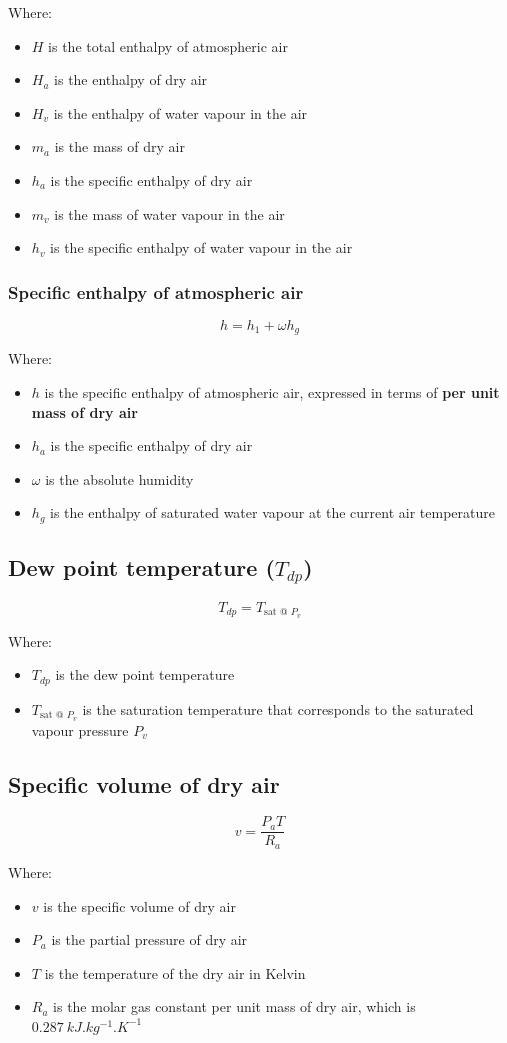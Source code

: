 \documentclass[11pt]{article}
\begin{document}
Where:
\begin{itemize}
\item \(H\) is the total enthalpy of atmospheric air
\item \(H_a\) is the enthalpy of dry air
\item \(H_v\) is the enthalpy of water vapour in the air
\item \(m_a\) is the mass of dry air
\item \(h_a\) is the specific enthalpy of dry air
\item \(m_v\) is the mass of water vapour in the air
\item \(h_v\) is the specific enthalpy of water vapour in the air
\end{itemize}
\subsubsection{Specific enthalpy of atmospheric air}
\label{sec:orgac27385}
\[h = h_1 + \omega h_g\]

Where:
\begin{itemize}
\item \(h\) is the specific enthalpy of atmospheric air, expressed in terms of \textbf{per unit mass of dry air}
\item \(h_a\) is the specific enthalpy of dry air
\item \(\omega\) is the absolute humidity
\item \(h_g\) is the enthalpy of saturated water vapour at the current air temperature
\end{itemize}
\subsection{Dew point temperature (\(T_{dp}\))}
\label{sec:org55f274e}
\[T_{dp} = T_{\text{sat @ } P_v}\]

Where:
\begin{itemize}
\item \(T_{dp}\) is the dew point temperature
\item \(T_{\text{sat @ } P_v}\) is the saturation temperature that corresponds to the saturated vapour pressure \(P_v\)
\end{itemize}
\subsection{Specific volume of dry air}
\label{sec:org1012c5b}
\[v = \frac{P_a T}{R_a}\]

Where:
\begin{itemize}
\item \(v\) is the specific volume of dry air
\item \(P_a\) is the partial pressure of dry air
\item \(T\) is the temperature of the dry air in Kelvin
\item \(R_{a}\) is the molar gas constant per unit mass of dry air, which is \(\qty{0.287}{kJ.kg^{-1}.K^{-1}}\)
\end{itemize}
\end{document}
